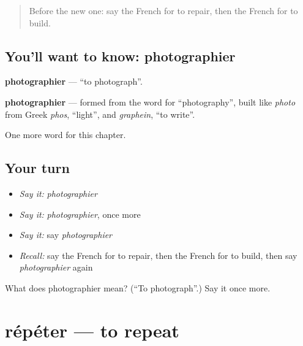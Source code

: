 \label{lesson:FR-C233-photographier}



\begin{quote}
Before the new one: say the French for to repair, then the French for to build.
\end{quote}

\subsection*{You'll want to know: photographier}
\textbf{photographier} — \textquotedblleft{}to photograph\textquotedblright{}.

\begin{cousinweb}
\textbf{photographier} — formed from the word for \textquotedblleft{}photography\textquotedblright{}, built like \emph{photo} from Greek \emph{phos}, \textquotedblleft{}light\textquotedblright{}, and \emph{graphein}, \textquotedblleft{}to write\textquotedblright{}.
\end{cousinweb}

\begin{grammarlens}[title={What you've built}]
One more word for this chapter.
\end{grammarlens}

\subsection*{Your turn}
\begin{itemize}
\raggedright
  \item \emph{Say it:} \emph{photographier}
  \item \emph{Say it:} \emph{photographier}, once more
  \item \emph{Say it:} say \emph{photographier}
  \item \emph{Recall:} say the French for to repair, then the French for to build, then say \emph{photographier} again
\end{itemize}

\begin{tcolorbox}[breakable,colback=teal!4,colframe=teal!35!black,title={Before you move on}]
What does photographier mean? (\textquotedblleft{}To photograph\textquotedblright{}.) Say it once more.
\end{tcolorbox}
\section[répéter]{répéter — to repeat}

